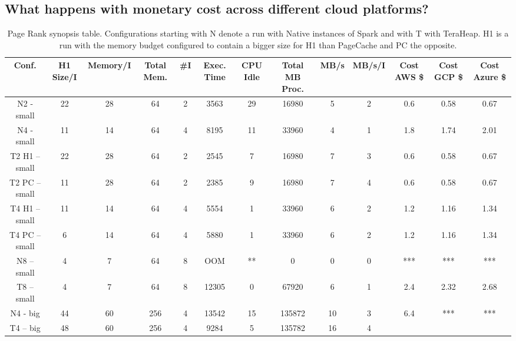 \subsection{What
happens with monetary cost across different cloud platforms?}

\iffalse
\begin{table}[htbp]
  \centering
	\begin{subtable}[b]{0.45\linewidth}
  \caption{Page Rank synopsis table. Configurations starting
    with N denote a run with Native instances of Spark and with T with
    TeraHeap. H1 is a run with the memory budget configured to contain
    a bigger size for H1 than PageCache and PC the opposite.}
  \label{tab:pr_table}
        \begin{tabular}{|c|c|c|c|c|c|c|c|c|c|c|c|c|}
      \hline
\textbf{Conf.} & \textbf{H1 Size/I} & \textbf{Memory/I} & \textbf{Total Mem.} & \textbf{\#I} & \textbf{Exec. Time} & \textbf{CPU Idle} & \textbf{Total MB Proc.} & \textbf{MB/s} & \textbf{MB/s/I} & \textbf{Cost AWS \$} & \textbf{Cost GCP \$} & \textbf{Cost Azure \$} \\
        \hline
    N2 - small & 22 & 28 & 64 & 2 & 3563 & 29 & 16980 & 5 & 2 & 0.6 & 0.58 & 0.67 \\
    N4 - small & 11 & 14 & 64 & 4 & 8195 & 11 & 33960 & 4 & 1 & 1.8 & 1.74 & 2.01 \\
    T2 H1 – small & 22 & 28 & 64 & 2 & 2545 & 7 & 16980 & 7 & 3 & 0.6 & 0.58 & 0.67 \\
    T2 PC – small & 11 & 28 & 64 & 2 & 2385 & 9 & 16980 & 7 & 4 & 0.6 & 0.58 & 0.67 \\
    T4 H1 – small & 11 & 14 & 64 & 4 & 5554 & 1 & 33960 & 6 & 2 & 1.2 & 1.16 & 1.34 \\
    T4 PC – small & 6 & 14 & 64 & 4 & 5880 & 1 & 33960 & 6 & 2 & 1.2 & 1.16 & 1.34 \\
    N8 – small & 4 & 7 & 64 & 8 & OOM & ** & 0 & 0 & 0 & *** & *** & *** \\
    T8 – small & 4 & 7 & 64 & 8 & 12305 & 0 & 67920 & 6 & 1 & 2.4 & 2.32 & 2.68 \\
    N4 - big & 44 & 60 & 256 & 4 & 13542 & 15 & 135872 & 10 & 3 & 6.4 & *** & *** \\
    T4 – big & 48 & 60 & 256 & 4 & 9284 & 5 & 135782 & 16 & 4 \\      
	\hline
     \end{tabular}%
\end{subtable}


\end{table}
